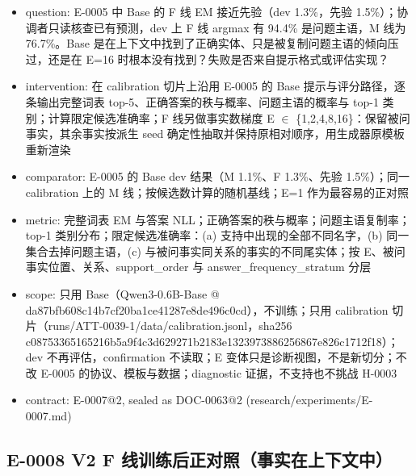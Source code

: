 \documentclass[11pt]{article}
\begin{document}
\begin{itemize}
\item question: E-0005 中 Base 的 F 线 EM 接近先验（dev 1.3\%，先验 1.5\%）；协调者只读核查已有预测，dev 上 F 线 argmax 有 94.4\% 是问题主语，M 线为 76.7\%。Base 是在上下文中找到了正确实体、只是被复制问题主语的倾向压过，还是在 E=16 时根本没有找到？失败是否来自提示格式或评估实现？
\item intervention: 在 calibration 切片上沿用 E-0005 的 Base 提示与评分路径，逐条输出完整词表 top-5、正确答案的秩与概率、问题主语的概率与 top-1 类别；计算限定候选准确率；F 线另做事实数梯度 E \ensuremath{\in} \{1,2,4,8,16\}：保留被问事实，其余事实按派生 seed 确定性抽取并保持原相对顺序，用生成器原模板重新渲染
\item comparator: E-0005 的 Base dev 结果（M 1.1\%、F 1.3\%、先验 1.5\%）；同一 calibration 上的 M 线；按候选数计算的随机基线；E=1 作为最容易的正对照
\item metric: 完整词表 EM 与答案 NLL；正确答案的秩与概率；问题主语复制率；top-1 类别分布；限定候选准确率：(a) 支持中出现的全部不同名字，(b) 同一集合去掉问题主语，(c) 与被问事实同关系的事实的不同尾实体；按 E、被问事实位置、关系、support\_order 与 answer\_frequency\_stratum 分层
\item scope: 只用 Base（Qwen3-0.6B-Base @ da87bfb608c14b7cf20ba1ce41287e8de496c0cd），不训练；只用 calibration 切片（runs/ATT-0039-1/data/calibration.jsonl，sha256 c08753365165216b5a9f4c3d629271b2183e1323973886256867e826c1712f18）；dev 不再评估，confirmation 不读取；E 变体只是诊断视图，不是新切分；不改 E-0005 的协议、模板与数据；diagnostic 证据，不支持也不挑战 H-0003
\item contract: E-0007@2, sealed as DOC-0063@2 (research/experiments/E-0007.md)
\end{itemize}

\subsection*{E-0008 V2 F 线训练后正对照（事实在上下文中）}
\end{document}
